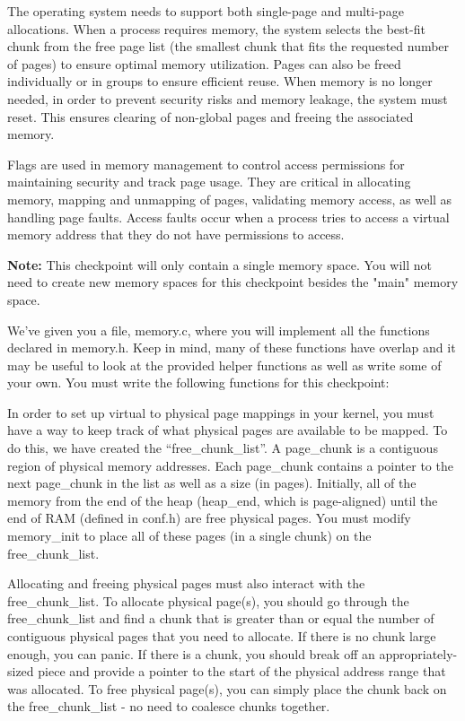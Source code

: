 \documentclass{article}
\begin{document}
	The operating system needs to support both single-page and multi-page allocations. When a process requires memory, the system selects the best-fit chunk 
	from the free page list (the smallest chunk that fits the requested number of pages) to ensure optimal memory utilization. Pages can also be freed individually 
	or in groups to ensure efficient reuse. When memory is no longer needed, in order to prevent security risks and memory leakage, the system must reset. 
	This ensures clearing of non-global pages and freeing the associated memory. 

	Flags are used in memory management to control access permissions for maintaining security and track page usage. They are critical in allocating memory, mapping and unmapping of pages, 
	validating memory access, as well as handling page faults. Access faults occur when a process tries to access a virtual memory address that they do not have
    permissions to access.

	\textbf{Note:} This checkpoint will only contain a single memory space. You will not need to create
	new memory spaces for this checkpoint besides the "main" memory space. 

	We've given you a file, {\fix memory.c}, where you will implement all the functions declared in {\fix memory.h}. Keep in mind, 
	many of these functions have overlap and it may be useful to look at the provided helper functions as well as write some of your own. You must write the following 
	functions for this checkpoint:
	
    In order to set up virtual to physical page mappings in your kernel, you must have a way to keep track of what physical
    pages are available to be mapped. To do this, we have created the ``{\fix free\_chunk\_list}''. A {\fix page\_chunk} is a contiguous region of physical memory addresses.
    Each {\fix page\_chunk} contains a pointer to the next {\fix page\_chunk} in the list as well as a size (in pages). Initially, all of the memory from the end
    of the heap ({\fix heap\_end}, which is page-aligned) until the end of RAM (defined in {\fix conf.h}) are free physical pages. You must modify {\fix memory\_init} to place
    all of these pages (in a single chunk) on the {\fix free\_chunk\_list}.

    Allocating and freeing physical pages must also interact with the {\fix free\_chunk\_list}. To allocate physical page(s), you should go through the {\fix free\_chunk\_list}
    and find a chunk that is greater than or equal the number of contiguous physical pages that you need to allocate. If there is no chunk large enough, you can panic. If there is a chunk, you should
    break off an appropriately-sized piece and provide a pointer to the start of the physical address range that was allocated. To free physical page(s), you can simply place the chunk
    back on the {\fix free\_chunk\_list} - no need to coalesce chunks together.
    
\end{document}
